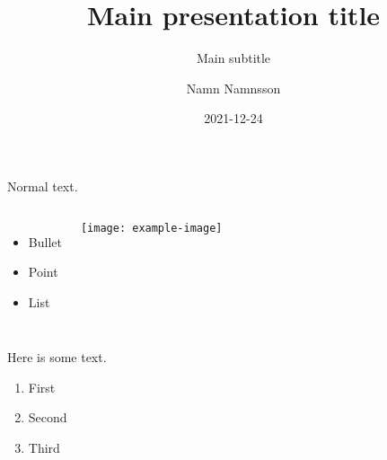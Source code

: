 \documentclass[aspectratio=169,10pt]{uu-beamer}
\title{Main presentation title}
\subtitle{Main subtitle}
\author[N. Namnsson]{Namn Namnsson}
\date{2021-12-24}
\institute[UU]{Uppsala Universitet}
\begin{document}
\logopage

\titlepage



\begin{frame}
    Normal text.

    \begin{columns}
        \begin{itemize}
        \item Bullet
        \item Point
        \item List
        \end{itemize}

        \texttt{[image: example-image]}
      \end{columns}
    
\end{frame}



\begin{frame}

  Here is some text.  \\[2ex] %

  \begin{enumerate}
    \item First
    \item Second
    \item Third
  \end{enumerate}
  
\end{frame}
\end{document}
